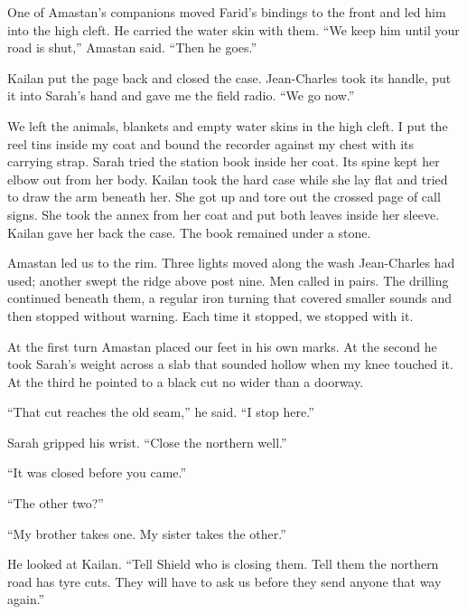 One of Amastan's companions moved Farid's bindings to the front and led him into the high cleft. He carried the water skin with them. ``We keep him until your road is shut,'' Amastan said. ``Then he goes.''\par

Kailan put the page back and closed the case. Jean-Charles took its handle, put it into Sarah's hand and gave me the field radio. ``We go now.''\par

We left the animals, blankets and empty water skins in the high cleft. I put the reel tins inside my coat and bound the recorder against my chest with its carrying strap. Sarah tried the station book inside her coat. Its spine kept her elbow out from her body. Kailan took the hard case while she lay flat and tried to draw the arm beneath her. She got up and tore out the crossed page of call signs. She took the annex from her coat and put both leaves inside her sleeve. Kailan gave her back the case. The book remained under a stone.\par

Amastan led us to the rim. Three lights moved along the wash Jean-Charles had used; another swept the ridge above post nine. Men called in pairs. The drilling continued beneath them, a regular iron turning that covered smaller sounds and then stopped without warning. Each time it stopped, we stopped with it.\par

At the first turn Amastan placed our feet in his own marks. At the second he took Sarah's weight across a slab that sounded hollow when my knee touched it. At the third he pointed to a black cut no wider than a doorway.\par

``That cut reaches the old seam,'' he said. ``I stop here.''\par

Sarah gripped his wrist. ``Close the northern well.''\par

``It was closed before you came.''\par

``The other two?''\par

``My brother takes one. My sister takes the other.''\par

He looked at Kailan. ``Tell Shield who is closing them. Tell them the northern road has tyre cuts. They will have to ask us before they send anyone that way again.''\par

